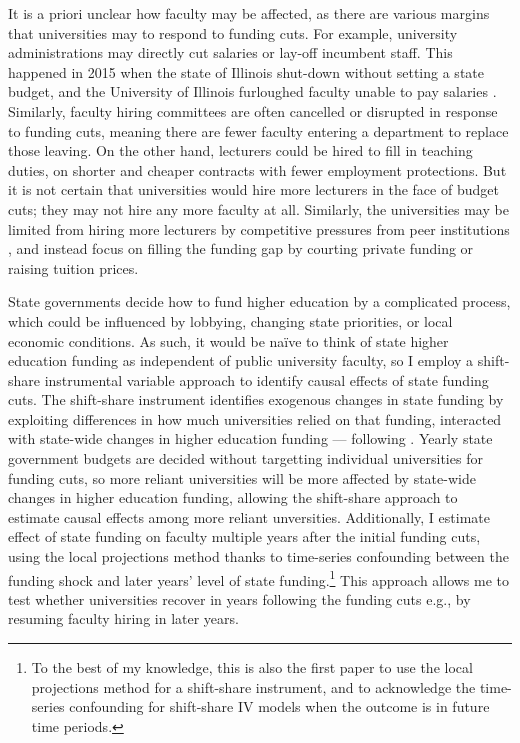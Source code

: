 It is a priori unclear how faculty may be affected, as there are various margins that universities may to respond to funding cuts.
For example, university administrations may directly cut salaries or lay-off incumbent staff.
This happened in 2015 when the state of Illinois shut-down without setting a state budget, and the University of Illinois furloughed faculty unable to pay salaries \citep{furlough2010}.
Similarly, faculty hiring committees are often cancelled or disrupted in response to funding cuts, meaning there are fewer faculty entering a department to replace those leaving.
On the other hand, lecturers could be hired to fill in teaching duties, on shorter and cheaper contracts with fewer employment protections.
But it is not certain that universities would hire more lecturers in the face of budget cuts; they may not hire any more faculty at all.
Similarly, the universities may be limited from hiring more lecturers by competitive pressures from peer institutions \citep{hoxby2009changing,urquiola2020markets}, and instead focus on filling the funding gap by courting private funding or raising tuition prices.

State governments decide how to fund higher education by a complicated process, which could be influenced by lobbying, changing state priorities, or local economic conditions.
As such, it would be na\"ive to think of state higher education funding as independent of public university faculty, so I employ a shift-share instrumental variable approach to identify causal effects of state funding cuts.
The shift-share instrument identifies exogenous changes in state funding by exploiting differences in how much universities relied on that funding, interacted with state-wide changes in higher education funding --- following \cite{NBERw23736,NBERw27885}.
Yearly state government budgets are decided without targetting individual universities for funding cuts, so more reliant universities will be more affected by state-wide changes in higher education funding, allowing the shift-share approach to estimate causal effects among more reliant unversities.
Additionally, I estimate effect of state funding on faculty multiple years after the initial funding cuts, using the local projections method thanks to time-series confounding between the funding shock and later years' level of state funding.\footnote{
    To the best of my knowledge, this is also the first paper to use the local projections method for a shift-share instrument, and to acknowledge the time-series confounding for shift-share IV models when the outcome is in future time periods.
}
This approach allows me to test whether universities recover in years following the funding cuts e.g., by resuming faculty hiring in later years. 

